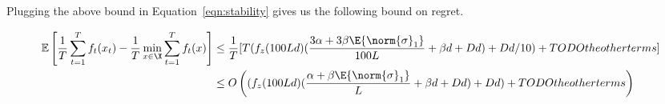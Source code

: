 Plugging the above bound in Equation~\eqref{eqn:stability} gives us the following bound on regret.

\begin{align}
    \mathbb{E}\left[ \frac{1}{T}\sum_{t=1}^T f_t(x_t) - \frac{1}{T}\min_{x\in \X}\sum_{t=1}^T f_t(x) \right] &\leq \frac{1}{T}[ T (f_z(100Ld)( \frac{3\alpha + 3\beta\E{\norm{\sigma}_1} }{100L} + \beta d + Dd) + Dd/10) + TODO the other terms]\\
  & \leq O\left( (f_z(100Ld)( \frac{\alpha + \beta\E{\norm{\sigma}_1} }{L} + \beta d + Dd) + Dd) + TODO the other terms \right)
\end{align}


